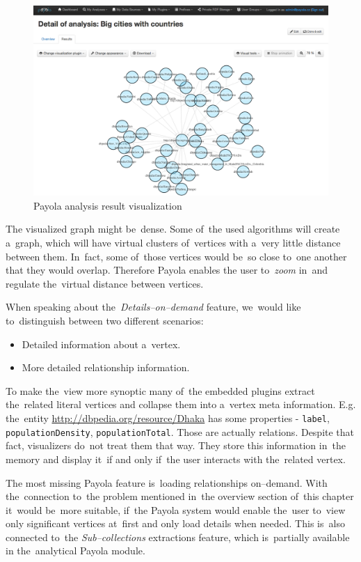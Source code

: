 \begin{figure}
	\centering
	\includegraphics[width=140mm]{img/payola.png}
	\caption{Payola analysis result visualization}
	\label{fig:palyola-vis}
\end{figure}


The visualized graph might be~dense. Some of~the used algorithms will create a~graph, which
will have virtual clusters of~vertices with a~very little distance between them. In~fact, some of~those
vertices would be~so close to~one another that they would overlap. Therefore Payola enables the
user to~\emph{zoom} in~and regulate the~virtual distance between vertices.

When speaking about the~\emph{Details--on--demand} feature, we~would like to~distinguish
between two different
scenarios:

\begin{itemize}
\item Detailed information about a~vertex.
\item More detailed relationship information.
\end{itemize}

To make the~view more synoptic many of~the embedded plugins extract the~related literal
vertices and collapse them into a~vertex meta information. E.g. the~entity
\url{http://dbpedia.org/resource/Dhaka} has some properties - \texttt{label},
\texttt{populationDensity}, \texttt{populationTotal}.
Those are actually relations. Despite that fact, visualizers do~not treat them
that way. They store this information in~the memory and display it~if and only if~the user
interacts with the~related vertex.

The most missing Payola feature is~loading relationships on--demand. With the~connection to~the
problem
mentioned in~the overview section of~this chapter it~would be~more suitable, if~the Payola system
would enable the~user to~view only significant vertices at~first and only load details when needed.
This is~also connected to~the \emph{Sub--collections} extractions feature, which is~partially available
in the~analytical Payola module.

